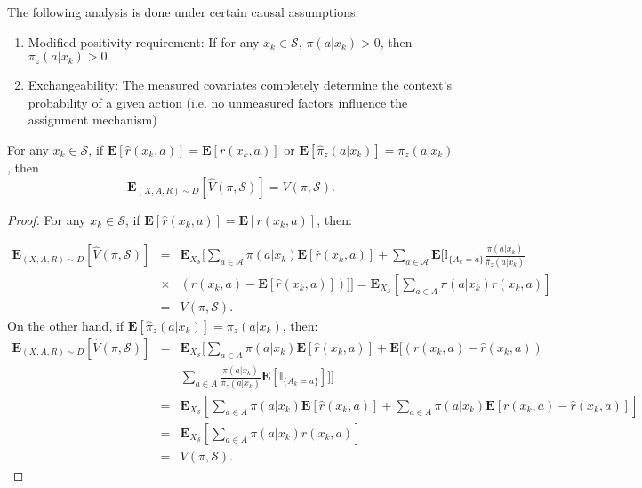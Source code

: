 The following analysis is done under certain causal assumptions:
\begin{enumerate}
    \item Modified positivity requirement: If for any $x_k \in \mathcal{S}$, $\pi(a|x_k) > 0$, then $\pi_z(a|x_k) > 0$ 
    \item  Exchangeability: The measured covariates completely determine the context's probability of a given action (i.e. no unmeasured factors influence the assignment mechanism)
\end{enumerate}


\begin{theorem}
For any $x_k \in \mathcal{S}$, if $\mathbf{E}[\widehat{r}(x_k,a)] = \mathbf{E}[r(x_k,a)]$ or $\mathbf{E}[\hat{\pi}_{z}(a|x_k)] = \pi_{z}(a|x_k)$, then  $$\mathbf{E}_{(X, A, R) \sim D}[\widehat{V}(\pi, \mathcal{S})] = V(\pi, \mathcal{S}).$$
\end{theorem}

\begin{proof}
For any $x_k \in \mathcal{S}$, if $\mathbf{E}[\widehat{r}(x_k,a)] = \mathbf{E}[r(x_k,a)]$, then:

\begin{eqnarray*}
\mathbf{E}_{(X, A, R) \sim D}[\widehat{V}(\pi, \mathcal{S})] &=&    \mathbf{E}_{X_\mathcal{S}}\Bigg[\sum_{a \in \mathcal{A}} \pi(a|x_k)\mathbf{E}[\hat{r}(x_k, a)] + \sum_{a \in \mathcal{A}} \mathbf{E}\bigg[ 
\mathbb{I}_{\{A_k = a\}}\frac{\pi(a|x_k)}{\hat{\pi}_{z}(a|x_k)} \\
&\times&  (r(x_k, a) - \mathbf{E}[\hat{r}(x_k, a)]) \bigg] \Bigg] = \mathbf{E}_{X_\mathcal{S}}\left[\sum_{a \in A} \pi(a|x_k) r(x_k, a)\right]\\
&=& V(\pi, \mathcal{S}).
\end{eqnarray*}
On the other hand, if $\mathbf{E}[\hat{\pi}_{z}(a|x_k)] = \pi_{z}(a|x_k)$, then:
\begin{eqnarray*}
\mathbf{E}_{(X, A, R) \sim D}[\widehat{V}(\pi, \mathcal{S})] &=&  \mathbf{E}_{X_\mathcal{S}}\Bigg[\sum_{a \in A} \pi(a|x_k) \mathbf{E}[\hat{r}(x_k, a)] + \mathbf{E} \bigg[  (r(x_k, a) - \hat{r}(x_k, a))   \\
& & \sum_{a \in A} \frac{\pi(a|x_k)}{\hat{\pi}_{z}(a|x_k)} \mathbf{E} \left[ \mathbb{I}_{\{A_k =a\}}\right]\bigg] \Bigg]\\
&=& \mathbf{E}_{X_\mathcal{S}}\left[ \sum_{a \in A} \pi(a|x_k) \mathbf{E}[\hat{r}(x_k, a)] + \sum_{a \in A}   \pi(a|x_k) \mathbf{E} \left[ r(x_k, a) - \hat{r}(x_k, a)\right] \right]\\
&=& \mathbf{E}_{X_\mathcal{S}}\left[\sum_{a \in A}   \pi(a|x_k) r(x_k, a)  \right]\\
&=& V(\pi, \mathcal{S}).
\end{eqnarray*}
\end{proof}

